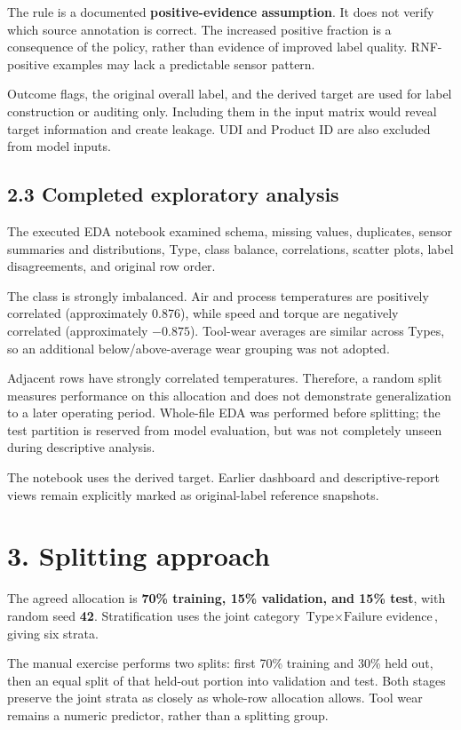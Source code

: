 \documentclass[11pt,a4paper]{article}
\newcommand{\pagetitle}[1]{\section*{#1}}
\begin{document}
The rule is a documented \textbf{positive-evidence assumption}. It does not
verify which source annotation is correct. The increased positive fraction
is a consequence of the policy, rather than evidence of improved label
quality. RNF-positive examples may lack a predictable sensor pattern.

Outcome flags, the original overall label, and the derived target are used
for label construction or auditing only. Including them in the input matrix
would reveal target information and create leakage. UDI and Product ID are
also excluded from model inputs.

\subsection*{2.3 Completed exploratory analysis}
The executed EDA notebook examined schema, missing values, duplicates,
sensor summaries and distributions, Type, class balance, correlations,
scatter plots, label disagreements, and original row order.

The class is strongly imbalanced. Air and process temperatures are positively
correlated (approximately 0.876), while speed and torque are negatively
correlated (approximately $-0.875$). Tool-wear averages are similar across
Types, so an additional below/above-average wear grouping was not adopted.

Adjacent rows have strongly correlated temperatures. Therefore, a random
split measures performance on this allocation and does not demonstrate
generalization to a later operating period. Whole-file EDA was performed
before splitting; the test partition is reserved from model evaluation,
but was not completely unseen during descriptive analysis.

The notebook uses the derived target. Earlier dashboard and descriptive-report
views remain explicitly marked as original-label reference snapshots.

\newpage
\pagetitle{3. Splitting approach}
The agreed allocation is \textbf{70\% training, 15\% validation, and 15\% test},
with random seed \textbf{42}. Stratification uses the joint category
\(\text{Type} \times \text{Failure evidence}\), giving six strata.

The manual exercise performs two splits: first 70\% training and 30\% held
out, then an equal split of that held-out portion into validation and test.
Both stages preserve the joint strata as closely as whole-row allocation allows.
Tool wear remains a numeric predictor, rather than a splitting group.
\end{document}
